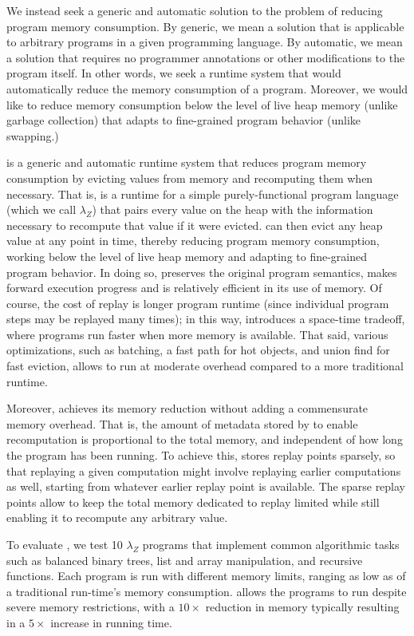 We instead seek a generic and automatic solution to the problem
  of reducing program memory consumption.
By generic, we mean a solution
  that is applicable to arbitrary programs
  in a given programming language.
By automatic, we mean a solution
  that requires no programmer annotations
  or other modifications to the program itself.
In other words, we seek a runtime system
  that would automatically reduce the memory consumption
  of a program.
Moreover, we would like to reduce memory consumption
  below the level of live heap memory
  (unlike garbage collection)
  that adapts to fine-grained program behavior
  (unlike swapping.)

\name is a generic and automatic runtime system
  that reduces program memory consumption
  by evicting values from memory
  and recomputing them when necessary.
That is, \name is a runtime
  for a simple purely-functional program language
  (which we call $\lambda_Z$)
  that pairs every value on the heap
  with the information necessary
  to recompute that value if it were evicted.
\name can then evict any heap value
  at any point in time,
  thereby reducing program memory consumption,
  working below the level of live heap memory
  and adapting to fine-grained program behavior.
In doing so,
  \name preserves the original program semantics,
  makes forward execution progress
  and is relatively efficient in its use of memory.
Of course, the cost of replay
  is longer program runtime
  (since individual program steps may be replayed many times);
  in this way, \name introduces a space-time tradeoff,
  where programs run faster when more memory is available.
That said, various optimizations,
  such as batching, a fast path for hot objects,
  and union find for fast eviction,
  allows \name to run at moderate overhead
  compared to a more traditional runtime.

Moreover, \name achieves its memory reduction
  without adding a commensurate memory overhead.
That is, the amount of metadata stored by \name
  to enable recomputation
  is proportional to the total memory,
  and independent of how long the program has been running.
To achieve this,
  \name stores replay points sparsely,
  so that replaying a given computation
  might involve replaying earlier computations as well,
  starting from whatever earlier replay point is available.
The sparse replay points
  allow \name to keep the total memory dedicated to replay limited
  while still enabling it to recompute any arbitrary value.

To evaluate \name,
  we test 10 $\lambda_Z$ programs
  that implement common algorithmic tasks
  such as balanced binary trees, list and array manipulation,
  and recursive functions.
Each program is run with different memory limits,
  ranging as low as 
  of a traditional run-time's memory consumption.
\name allows the programs to run
  despite severe memory restrictions,
  with a $10\times$ reduction in memory
  typically resulting in a $5\times$ increase in running time.

